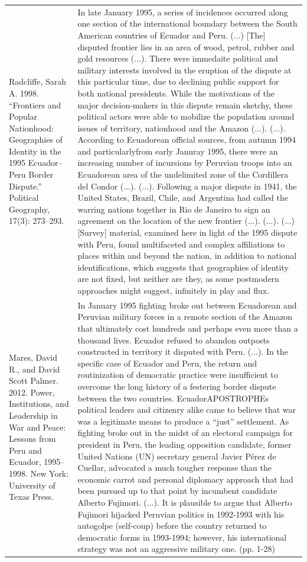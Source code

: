 {\begin{longtable}{p{}p{}}
\\
Radcliffe, Sarah A. 1998. “Frontiers and Popular Nationhood: Geographies of Identity in the 1995 Ecuador–Peru Border Dispute.” Political Geography, 17(3): 273–293. & In late January 1995, a series of incidences occurred along one section of the international boundary between the South American countries of Ecuador and Peru. (...) [The] disputed frontier lies in an area of wood, petrol, rubber and gold resources (...). There were immedaite political and military interests involved in the eruption of the dispute at this particular time, due to declining public support for both national presidents. While the motivations of the major decision-makers in this dispute remain sketchy, these political actors were able to mobilize the population around issues of territory, nationhood and the Amazon (...). (...). According to Ecuadorean official sources, from autumn 1994 and particularlyfrom early Januray 1995, there were an increasing number of incursions by Peruvian troops into an Ecuadorean area of the undelimited zone of the Cordillera del Condor (...). (...). Following a major dispute in 1941, the United States, Brazil, Chile, and Argentina had called the warring nations together in Rio de Janeiro to sign an agreement on the location of the new frontier (...). (...). 
(...) [Survey] material, examined here in light of the 1995 dispute with Peru, found multifaceted and complex affiliations to places within and beyond the nation, in addition to national identifications, which suggests that geographies of identity are not fixed, but neither are they, as some postmodern approaches might suggest, infinitely in play and flux. 
\\
Mares, David R., and David Scott Palmer. 2012. Power, Institutions, and Leadership in War and Peace: Lessons from Peru and Ecuador, 1995–1998. New York: University of Texas Press. & In January 1995 fighting broke out between Ecuadorean and Peruvian military forces in a remote section of the Amazon that ultimately cost hundreds and perhaps even more than a thousand lives. Ecuador refused to abandon outposts constructed in territory it disputed with Peru. (...). In the specific case of Ecuador and Peru, the return and routinization of democratic practice were insufficient to overcome the long history of a festering border dispute between the two countries. EcuadorAPOSTROPHEs political leaders and citizenry alike came to believe that war was a legitimate means to produce a “just” settlement. As fighting broke out in the midst of an electoral campaign for president in Peru, the leading opposition candidate, former United Nations (UN) secretary general Javier Pérez de Cuellar, advocated a much tougher response than the economic carrot and personal diplomacy approach that had been pursued up to that point by incumbent candidate Alberto Fujimori. (...). It is plausible to argue that Alberto Fujimori hijacked Peruvian politics in 1992-1993 with his autogolpe (self-coup) before the country returned to democratic forms in 1993-1994; however, his international strategy was not an aggressive military one. (pp. 1-28)


\end{longtable}}
